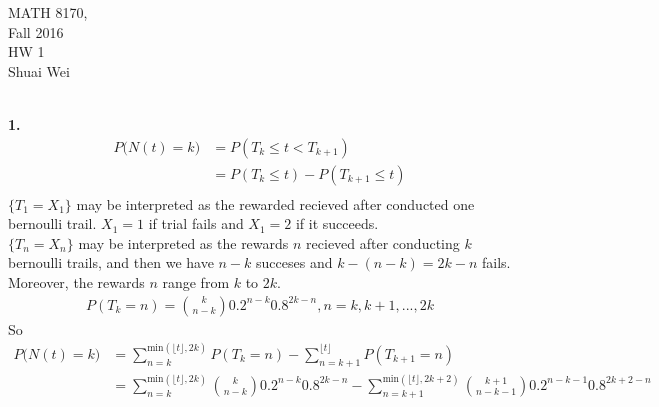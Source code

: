 \documentclass{amsart}
\theoremstyle{plain}
\theoremstyle{definition}
\begin{document}
\noindent MATH 8170,  \\
Fall 2016\\
HW 1\\
Shuai Wei \\
\
\textwidth 6.0in \oddsidemargin 0.0in

\noindent \textbf{1.} \\

\begin{align*}
	P\big(N(t) = k\big)  &= P(T_k \leq t < T_{k+1}) \\
						&= P(T_k \leq t) - P(T_{k+1} \leq t) \\
\end{align*}
	$\{T_1 = X_1\}$ may be interpreted as the rewarded recieved after conducted one bernoulli trail. $X_1 = 1$ if trial fails and $X_1 = 2$ if it succeeds.\\
	$\{T_n = X_n\}$ may be interpreted as the rewards $n$ recieved after conducting $k$ bernoulli trails, and then we have $n-k$ succeses and $k-(n-k) = 2k-n$ fails. Moreover, the rewards $n$ range from $k$ to $2k$. \\
	\begin{align*}
		P(T_k = n)  = {k \choose {n-k}} 0.2^{n-k} 0.8^{2k-n}, n = k, k+1, ..., 2k 
	\end{align*}
 So
 	\begin{align*}
		P\big(N(t) = k\big) &= \sum_{n = k}^{\text{min}(\lfloor t\rfloor,2k)} P(T_k = n) - \sum_{n = k+1}^{\lfloor t\rfloor} P(T_{k+1} = n) \\
	   				  	  &= \sum_{n = k}^{\text{min}(\lfloor t\rfloor,2k)} {k \choose {n-k}} 0.2^{n-k} 0.8^{2k-n} - \sum_{n = k+1}^{\text{min}(\lfloor t\rfloor,2k+2)} {k+1 \choose {n-k-1}} 0.2^{n-k-1} 0.8^{2k+2-n} \\
 	\end{align*}
 
\end{document}
